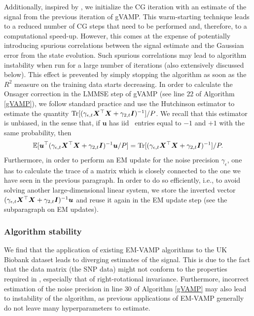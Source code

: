 Additionally, inspired by \cite{schniter2021gampmatlab,skuratovs2022warmstarting}, we initialize the CG iteration with an estimate of the signal from the previous iteration of gVAMP. This warm-starting technique leads to a reduced number of CG steps that need to be performed and, therefore, to a computational speed-up. However, this comes at the expense of potentially introducing spurious correlations between the signal estimate and the Gaussian error from the state evolution. Such spurious correlations may lead to algorithm instability when run for a large number of iterations (also extensively discussed below). This effect is prevented by simply stopping the algorithm as soon as the $R^2$ measure on the training data starts decreasing.
In order to calculate the Onsager correction in the LMMSE step of gVAMP (see line $22$ of Algorithm \ref{gVAMP}), we follow standard practice \cite{schniter2021gampmatlab} and use the Hutchinson estimator \cite{Hutchinson} to estimate the quantity $\text{Tr}[(\gamma_{\epsilon,t} {\boldsymbol X}^\top {\boldsymbol X} + \gamma_{2,t} \bm{I})^{-1}]/P$. We recall that this estimator is unbiased, in the sense that, if $\bm{u}$ has \gls{iid} \ entries equal to $-1$ and $+1$ with the same probability, then
\begin{align}
    \mathbb{E}[\bm{u}^\top(\gamma_{\epsilon,t} {\boldsymbol X}^\top {\boldsymbol X} + \gamma_{2,t} \bm{I})^{-1}\bm{u}/ P ] = \text{Tr}[(\gamma_{\epsilon,t} {\boldsymbol X}^\top {\boldsymbol X} + \gamma_{2,t} \bm{I})^{-1}]/P.
\end{align}    
Furthermore, in order to perform an EM update for the noise precision $\gamma_\epsilon$, one has to calculate the trace of a matrix which is closely connected to the one we have seen in the previous paragraph. In order to do so efficiently, i.e., to avoid solving another large-dimensional linear system, we store the inverted vector $(\gamma_{\epsilon,t} {\boldsymbol X}^\top {\boldsymbol X} + \gamma_{2,t} \bm{I})^{-1}\bm{u}$ and reuse it again in the EM update step (see the subparagraph on EM updates).

\subsubsection{Algorithm stability}
We find that the application of existing EM-VAMP algorithms to the UK Biobank dataset leads to diverging estimates of the signal. This is due to the fact that the data matrix (the SNP data) might not conform to the properties required in \cite{rangan_vector_2019}, especially that of right-rotational invariance. Furthermore, incorrect estimation of the noise precision in line 30 of Algorithm \ref{gVAMP} may also lead to instability of the algorithm, as previous applications of EM-VAMP generally do not leave many hyperparameters to estimate.

